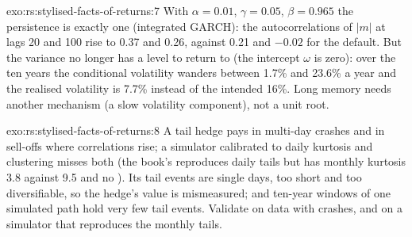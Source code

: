 \begin{solution}{exo:rs:stylised-facts-of-returns:7}
With $\alpha = 0.01$, $\gamma = 0.05$, $\beta = 0.965$ the persistence is exactly one (integrated GARCH): the autocorrelations of $|m|$
at lags 20 and 100 rise to 0.37 and 0.26, against 0.21 and $-0.02$ for the default. But the variance no longer has a level to return
to (the intercept $\omega$ is zero): over the ten years the conditional volatility wanders between 1.7\% and 23.6\% a year and the
realised volatility is 7.7\% instead of the intended 16\%. Long memory needs another mechanism (a slow volatility component), not a
unit root.
\end{solution}

\begin{solution}{exo:rs:stylised-facts-of-returns:8}
A tail hedge pays in multi-day crashes and in sell-offs where correlations rise; a simulator calibrated to daily kurtosis and
clustering misses both (the book's reproduces daily tails but has monthly kurtosis 3.8 against 9.5 and no ). Its
tail events are single days, too short and too diversifiable, so the hedge's value is mismeasured; and ten-year windows of one
simulated path hold very few tail events. Validate on data with crashes, and on a simulator that reproduces the monthly tails.
\end{solution}

